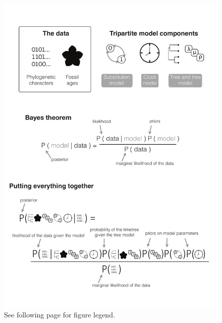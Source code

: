 \documentclass[11pt]{article}
\begin{document}
\begin{figure}
\centering
\includegraphics[width=\textwidth]{figures/bayes-theorem-v2.pdf}
\caption{\footnotesize See following page for figure legend.}
\label{fig:bayes}
\end{figure}

\clearpage

\caption{\footnotesize \textbf{A tripartite model for Bayesian divergence time estimation.}
The top panel shows the key ingredients required during inference.
The data used to generate time calibrated trees: molecular or morphological phylogenetic characters, and age information, typically fossil sampling times.
The model includes the substitution (site) model, which describes the evolution of characters, the clock model, which describes the distribution of evolutionary rates across the tree, and the tree model, which describes the distribution of speciation events across the tree.
Bayes theorem is presented in the middle panel. 
The bottom panel illustrates how everything comes together for the Bayesian estimation of divergence times.
}
\end{document}

